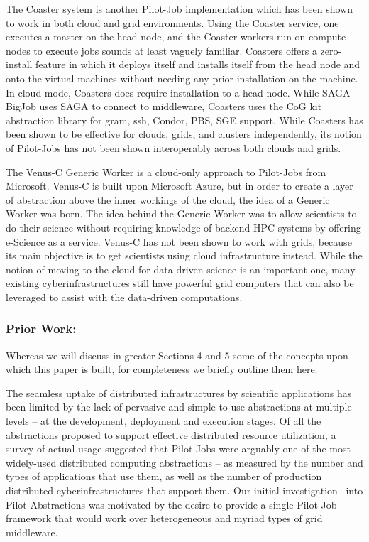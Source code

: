 \documentclass[times]{cpeauth}
\newcommand{\alnote}[1]{ {\textcolor{green} { ***andreL: #1 }}}
\newcommand{\alnote}[1]{}
\newcommand{\pilot}{Pilot\xspace}
\newcommand{\pilotjob}{Pilot-Job\xspace}
\newcommand{\pilotjobs}{Pilot-Jobs\xspace}
\begin{document}
The Coaster system\cite{coasters} is another \pilotjob implementation which
has been shown to work in both cloud and grid environments. Using the Coaster
service, one executes a master on the head node, and the Coaster workers run
on compute nodes to execute jobs sounds at least vaguely familiar. Coasters
offers a zero-install feature in which it deploys itself and installs itself
from the head node and onto the virtual machines without needing any prior
installation on the machine. In cloud mode, Coasters does require installation
to a head node. While SAGA BigJob uses SAGA to connect to middleware, Coasters
uses the CoG kit abstraction library for gram, ssh, Condor, PBS, SGE support.
While Coasters has been shown to be effective for clouds, grids, and clusters
independently, its notion of \pilotjobs has not been shown interoperably
across both clouds and grids.
 
The Venus-C Generic Worker\cite{venusc-generic-worker} is a cloud-only
approach to \pilotjobs from Microsoft. Venus-C is built upon Microsoft Azure,
but in order to create a layer of abstraction above the inner workings of the
cloud, the idea of a Generic Worker was born. The idea behind the Generic
Worker was to allow scientists to do their science without requiring knowledge
of backend HPC systems by offering e-Science as a service. Venus-C has not
been shown to work with grids, because its main objective is to get scientists
using cloud infrastructure instead. While the notion of moving to the cloud
for data-driven science is an important one, many existing
cyberinfrastructures still have powerful grid computers that can also be
leveraged to assist with the data-driven computations.

\subsubsection*{Prior Work:}

Whereas we will discuss in greater Sections 4 and 5 some of the
concepts upon which this paper is built, for completeness we briefly
outline them here.

 The seamless uptake of distributed
infrastructures by scientific applications has been limited by the
lack of pervasive and simple-to-use abstractions at multiple levels –
at the development, deployment and execution stages. Of all the
abstractions proposed to support effective distributed resource
utilization, a survey of actual usage suggested that \pilotjobs were
arguably one of the most widely-used distributed computing
abstractions – as measured by the number and types of applications
that use them, as well as the number of production distributed
cyberinfrastructures that support them.  Our initial
investigation~\cite{Luckow:2008la} into \pilot-Abstractions
was motivated by the desire to provide a single \pilotjob framework
that would work over heterogeneous and myriad types of grid middleware.
\end{document}
